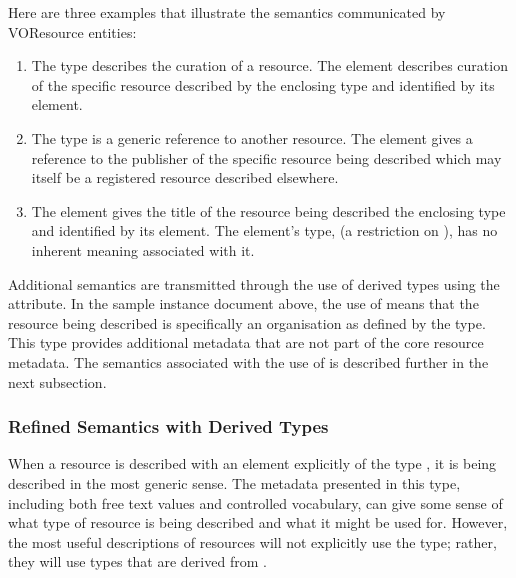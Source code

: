 \documentclass[11pt,a4paper]{ivoa}
\begin{document}
Here are three examples that illustrate the semantics communicated by
VOResource entities:

\begin{enumerate}
\item The  type describes the curation of a
       resource.  The  element
       describes curation of the specific resource described by the
       enclosing  type and identified by its
        element. 

  \item The  type is a generic reference to
       another resource.  The  element
       gives a reference to the publisher of the specific resource being
       described which may itself be a registered resource described
       elsewhere.  

  \item The  element gives the title of
       the resource being described the enclosing
        type and identified by its
        element.  The
        element's type,
        (a restriction on
       ), has no inherent meaning associated
       with it.   
\end{enumerate}


Additional semantics are transmitted through the use of derived types
using the  attribute.  In the sample instance document
above, the use of  means that the
resource being described is specifically an organisation as defined by
the  type.  This type provides additional
metadata that are not part of the core resource metadata.  The semantics
associated with the use of  is described further in the
next subsection.



\subsubsection{Refined Semantics with Derived Types}
\label{sect:derivedtypes}

When a resource is described with an element explicitly of the type
, it is being described in the most generic
sense.  The metadata presented in this type, including both free text
values and controlled vocabulary, can give some sense of what
type of resource is being described and what it might be used for.
However, the most useful descriptions of resources will not explicitly
use the  type; rather, they will use types
that are derived from .  
\end{document}
